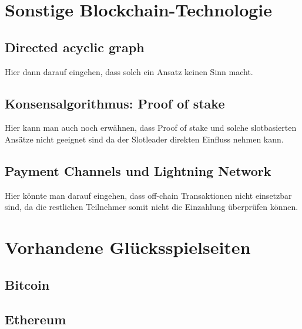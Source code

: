 \chapter{Sonstige Blockchain-Technologie} %
\section{Directed acyclic graph}
Hier dann darauf eingehen, dass solch ein Ansatz keinen Sinn macht.
\section{Konsensalgorithmus: Proof of stake }\label{pos}
Hier kann man auch noch erwähnen, dass Proof of stake und solche slotbasierten Ansätze nicht geeignet sind da der Slotleader direkten Einfluss nehmen kann.
\section{Payment Channels und Lightning Network}
Hier könnte man darauf eingehen, dass off-chain Transaktionen nicht einsetzbar sind, da die restlichen Teilnehmer somit nicht die Einzahlung überprüfen können.

\chapter{Vorhandene Glücksspielseiten}
\section{Bitcoin}

\section{Ethereum}